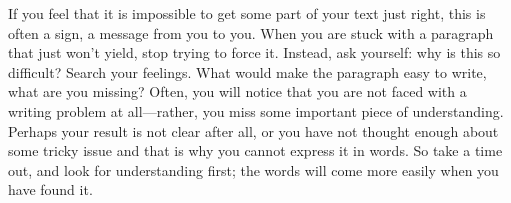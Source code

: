 If you feel that it is impossible to get some part of your text just right, this is often a sign, a message from you to you. When you are stuck with a paragraph that just won’t yield, stop trying to force it. Instead, ask yourself: why is this so difficult? Search your feelings. What would make the paragraph easy to write, what are you missing? Often, you will notice that you are not faced with a writing problem at all—rather, you miss some important piece of understanding. Perhaps your result is not clear after all, or you have not thought enough about some tricky issue and that is why you cannot express it in words. So take a time out, and look for understanding first; the words will come more easily when you have found it.